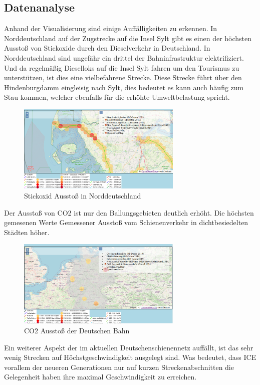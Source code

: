 \subsection{Datenanalyse}
Anhand der Visualisierung sind einige Auffälligkeiten zu erkennen.
In Norddeutschland auf der Zugstrecke auf die Insel Sylt gibt es einen der höchsten Ausstoß von Stickoxide durch den Dieselverkehr in Deutschland. In Norddeutschland sind ungefähr ein drittel der Bahninfrastruktur elektrifiziert.\cite{marschbahn} Und da regelmäßig Dieselloks auf die Insel Sylt fahren um den Tourismus zu unterstützen, ist dies eine vielbefahrene Strecke. Diese Strecke führt über den Hindenburgdamm eingleisig nach Sylt, dies bedeutet es kann auch häufig zum Stau kommen, welcher ebenfalls für die erhöhte Umweltbelastung spricht. \cite{marschbahn}
\begin{figure}[h]
\centering
	\includegraphics[width=0.7\textwidth]{images/Analyse1.png}
	\caption{Stickoxid Ausstoß in Norddeutschland}
\end{figure}
Der Ausstoß von CO2 ist nur den Ballungsgebieten deutlich erhöht. Die höchsten gemesenen Werte Gemessener Ausstoß vom Schienenverkehr in dichtbesiedelten Städten höher.
\begin{figure}[h]
\centering
	\includegraphics[width=0.7\textwidth]{images/Analyse3.png}
	\caption{CO2 Ausstoß der Deutschen Bahn}
\end{figure}
Ein weiterer Aspekt der im aktuellen Deutschenschienennetz auffällt, ist das sehr wenig Strecken auf Höchstgeschwindigkeit ausgelegt sind. Was bedeutet, dass ICE vorallem der neueren Generationen nur auf kurzen Streckenabschnitten die Gelegenheit haben ihre maximal Geschwindigkeit zu erreichen.
